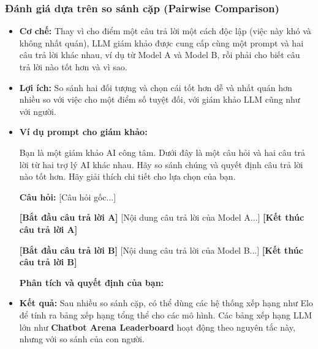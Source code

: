 \subsubsection{Đánh giá dựa trên so sánh cặp (Pairwise Comparison)}
\begin{itemize}
    \item \textbf{Cơ chế:} Thay vì cho điểm một câu trả lời một cách độc lập (việc này khó và không nhất quán), LLM giám khảo được cung cấp cùng một prompt và hai câu trả lời khác nhau, ví dụ từ Model A và Model B, rồi phải cho biết câu trả lời nào tốt hơn và vì sao.
    \item \textbf{Lợi ích:} So sánh hai đối tượng và chọn cái tốt hơn dễ và nhất quán hơn nhiều so với việc cho một điểm số tuyệt đối, với giám khảo LLM cũng như với người.
    \item \textbf{Ví dụ prompt cho giám khảo:}
        \begin{promptbox}
        Bạn là một giám khảo AI công tâm. Dưới đây là một câu hỏi và hai câu trả lời từ hai trợ lý AI khác nhau. Hãy so sánh chúng và quyết định câu trả lời nào tốt hơn. Hãy giải thích chi tiết cho lựa chọn của bạn.

        \textbf{Câu hỏi:} [Câu hỏi gốc...]
        
        \textbf{[Bắt đầu câu trả lời A]}
        [Nội dung câu trả lời của Model A...]
        \textbf{[Kết thúc câu trả lời A]}

        \textbf{[Bắt đầu câu trả lời B]}
        [Nội dung câu trả lời của Model B...]
        \textbf{[Kết thúc câu trả lời B]}

        \textbf{Phân tích và quyết định của bạn:}
        \end{promptbox}
    \item \textbf{Kết quả:} Sau nhiều so sánh cặp, có thể dùng các hệ thống xếp hạng như Elo để tính ra bảng xếp hạng tổng thể cho các mô hình. Các bảng xếp hạng LLM lớn như \textbf{Chatbot Arena Leaderboard} hoạt động theo nguyên tắc này, nhưng với so sánh của con người.
\end{itemize}

